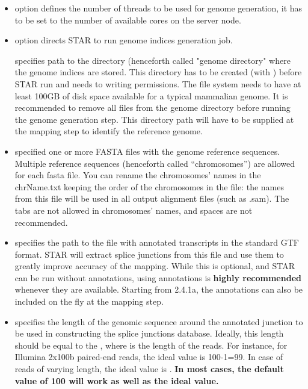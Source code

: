 \documentclass[12pt]{article}
\begin{document}
\begin{itemize}
\item[]
 option defines the number of threads to be used for genome generation, it has to be set to the number of available cores on the server node.

\item[]
  option directs STAR to run genome indices generation job.

 specifies path to the directory (henceforth called "genome directory" where the genome indices are stored. This directory has to be created (with ) before STAR run and needs to writing permissions. The file system needs to have at least 100GB of disk space available for a typical mammalian genome. It is recommended to remove all files from the genome directory before running the genome generation step. This directory path will have to be supplied at the mapping step to identify the reference genome.

\item[]
 specified one or more FASTA files with the genome reference sequences. Multiple reference sequences (henceforth called “chromosomes”) are allowed for each fasta file. You can rename the chromosomes’ names in the chrName.txt keeping the order of the chromosomes in the file: the names from this file will be used in all output alignment files (such as .sam). The tabs are not allowed in chromosomes’ names, and spaces are not recommended.

\item[]
 specifies the path to the file with annotated transcripts in the standard GTF format. STAR will extract splice junctions from this file and use them to greatly improve accuracy of the mapping. While this is optional, and STAR can be run without annotations, using annotations is \textbf{highly recommended} whenever they are available. Starting from 2.4.1a, the annotations can also be included on the fly at the mapping step.

\item[]
 specifies the length of the genomic sequence around the annotated junction to be used in constructing the splice junctions database. Ideally, this length should be equal to the , where  is the length of the reads. For instance, for Illumina 2x100b paired-end reads, the ideal value is 100-1=99. In case of reads of varying length, the ideal value is . \textbf{In most cases, the default value of 100 will work as well as the ideal value.}
\end{itemize}
\end{document}
